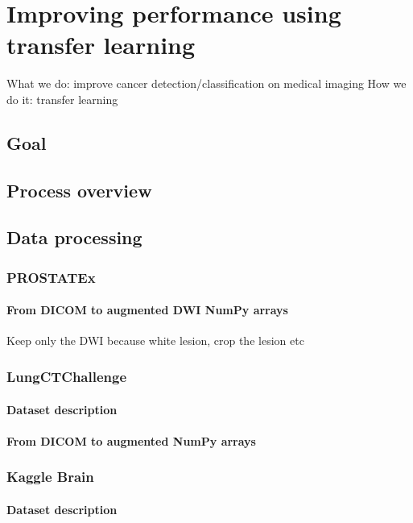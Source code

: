 
\chapter{Improving performance using transfer learning}
\label{ch:transfer_learning}

What we do: improve cancer detection/classification on medical imaging
How we do it: transfer learning

\section{Goal}

\section{Process overview}

\section{Data processing}
\subsection{PROSTATEx}
\subsubsection{From DICOM to augmented DWI NumPy arrays}
Keep only the DWI because white lesion, crop the lesion etc

\subsection{LungCTChallenge}
\subsubsection{Dataset description}
\subsubsection{From DICOM to augmented NumPy arrays}

\subsection{Kaggle Brain}
\subsubsection{Dataset description}
